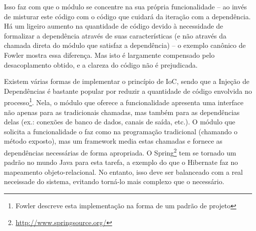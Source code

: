 \documentclass{abnt}
\begin{document}
Isso faz com que o módulo se concentre na sua própria funcionalidade – ao invés de misturar este código com o código que cuidará da iteração com a dependência. Há um ligeiro aumento na quantidade de código devido à necessidade de formalizar a dependência através de suas características (e não através da chamada direta do módulo que satisfaz a dependência) – o exemplo canônico de Fowler mostra essa diferença. Mas isto é largamente compensado pelo desacoplamento obtido, e a clareza do código não é prejudicada.

Existem várias formas de implementar o princípio de IoC, sendo que a Injeção de Dependências é bastante popular por reduzir a quantidade de código envolvida no processo\footnote{Fowler descreve esta implementação na forma de um padrão de projeto\cite{FowlerInjdep}}. Nela, o módulo que oferece a funcionalidade apresenta uma interface não apenas para as tradicionais chamadas, mas também para as dependências delas (ex.: conexões de banco de dados, canais de saída, etc.). O módulo que solicita a funcionalidade o faz como na programação tradicional (chamando o método exposto), mas um framework media estas chamadas e fornece as dependências necessárias de forma apropriada. O Spring\footnote{\url{http://www.springsource.org/}} tem se tornado um padrão no mundo Java para esta tarefa, a exemplo do que o Hibernate faz no mapeamento objeto-relacional. No entanto, isso deve ser balanceado com a real neceissade do sistema, evitando torná-lo mais complexo que o necessário.





\end{document}
